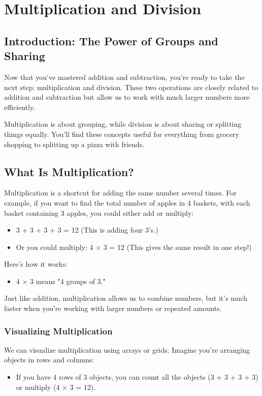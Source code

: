 \chapter{Multiplication and Division}

\section{Introduction: The Power of Groups and Sharing}
Now that you’ve mastered addition and subtraction, you’re ready to take the next step: multiplication and division. These two operations are closely related to addition and subtraction but allow us to work with much larger numbers more efficiently.

Multiplication is about grouping, while division is about sharing or splitting things equally. You’ll find these concepts useful for everything from grocery shopping to splitting up a pizza with friends.

\section{What Is Multiplication?}
Multiplication is a shortcut for adding the same number several times. For example, if you want to find the total number of apples in 4 baskets, with each basket containing 3 apples, you could either add or multiply:
\begin{itemize}
    \item 3 + 3 + 3 + 3 = 12 (This is adding four 3’s.)
    \item Or you could multiply: 4 × 3 = 12 (This gives the same result in one step!)
\end{itemize}

Here’s how it works:
\begin{itemize}
    \item 4 × 3 means "4 groups of 3."
\end{itemize}

Just like addition, multiplication allows us to combine numbers, but it’s much faster when you’re working with larger numbers or repeated amounts.

\subsection{Visualizing Multiplication}
We can visualize multiplication using arrays or grids. Imagine you’re arranging objects in rows and columns:
\begin{itemize}
    \item If you have 4 rows of 3 objects, you can count all the objects (3 + 3 + 3 + 3) or multiply (4 × 3 = 12).
\end{itemize}

